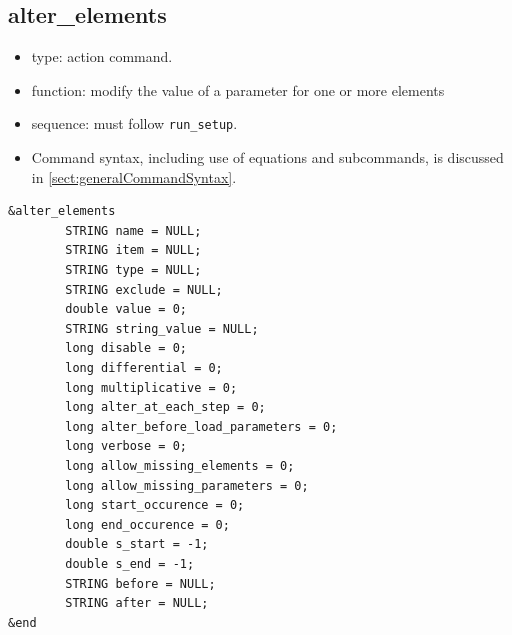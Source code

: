 \documentclass[11pt]{article}
\begin{document}
\subsection{alter\_elements\label{subsec:alterelements}}

\begin{itemize}
\item type: action command.
\item function: modify the value of a parameter for one or more elements
\item sequence: must follow \verb|run_setup|.
\item Command syntax, including use of equations and subcommands, is discussed in \ref{sect:generalCommandSyntax}.
\end{itemize}

\begin{verbatim}
&alter_elements
        STRING name = NULL;
        STRING item = NULL;
        STRING type = NULL;
        STRING exclude = NULL;
        double value = 0;
        STRING string_value = NULL;
        long disable = 0;
        long differential = 0;
        long multiplicative = 0;
        long alter_at_each_step = 0;
        long alter_before_load_parameters = 0;
        long verbose = 0;
        long allow_missing_elements = 0;
        long allow_missing_parameters = 0;
        long start_occurence = 0;
        long end_occurence = 0;
        double s_start = -1;
        double s_end = -1;
        STRING before = NULL;
        STRING after = NULL;
&end
\end{verbatim}
\end{document}
